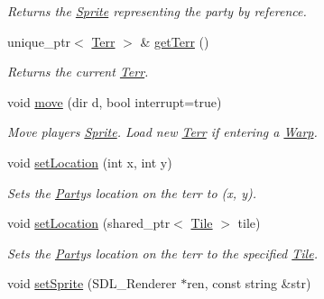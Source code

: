 \begin{DoxyCompactItemize}
\begin{DoxyCompactList}\small\item\em Returns the \hyperlink{class_sprite}{Sprite} representing the party by reference. \end{DoxyCompactList}\item 
unique\+\_\+ptr$<$ \hyperlink{class_terr}{Terr} $>$ \& \hyperlink{class_party_adde2e05d8910f1882e112ddc74576a9e}{get\+Terr} ()\hypertarget{class_party_adde2e05d8910f1882e112ddc74576a9e}{}\label{class_party_adde2e05d8910f1882e112ddc74576a9e}

\begin{DoxyCompactList}\small\item\em Returns the current \hyperlink{class_terr}{Terr}. \end{DoxyCompactList}\item 
void \hyperlink{class_party_a729f2e7fd90ec533a9173a5468b046fa}{move} (dir d, bool interrupt=true)\hypertarget{class_party_a729f2e7fd90ec533a9173a5468b046fa}{}\label{class_party_a729f2e7fd90ec533a9173a5468b046fa}

\begin{DoxyCompactList}\small\item\em Move player\textquotesingle{}s \hyperlink{class_sprite}{Sprite}. Load new \hyperlink{class_terr}{Terr} if entering a \hyperlink{class_warp}{Warp}. \end{DoxyCompactList}\item 
void \hyperlink{class_party_a2efe239264b319d3b50e1a5957fcd859}{set\+Location} (int x, int y)\hypertarget{class_party_a2efe239264b319d3b50e1a5957fcd859}{}\label{class_party_a2efe239264b319d3b50e1a5957fcd859}

\begin{DoxyCompactList}\small\item\em Sets the \hyperlink{class_party}{Party}\textquotesingle{}s location on the terr to (x, y). \end{DoxyCompactList}\item 
void \hyperlink{class_party_aba5ff3d67efb8c61a9cfa8f6b3bbf7b3}{set\+Location} (shared\+\_\+ptr$<$ \hyperlink{class_tile}{Tile} $>$ tile)\hypertarget{class_party_aba5ff3d67efb8c61a9cfa8f6b3bbf7b3}{}\label{class_party_aba5ff3d67efb8c61a9cfa8f6b3bbf7b3}

\begin{DoxyCompactList}\small\item\em Sets the \hyperlink{class_party}{Party}\textquotesingle{}s location on the terr to the specified \hyperlink{class_tile}{Tile}. \end{DoxyCompactList}\item 
void \hyperlink{class_party_abe069ffbbf3352f6b39246c8382dd26b}{set\+Sprite} (S\+D\+L\+\_\+\+Renderer $\ast$ren, const string \&str)\hypertarget{class_party_abe069ffbbf3352f6b39246c8382dd26b}{}\label{class_party_abe069ffbbf3352f6b39246c8382dd26b}


\end{DoxyCompactItemize}
